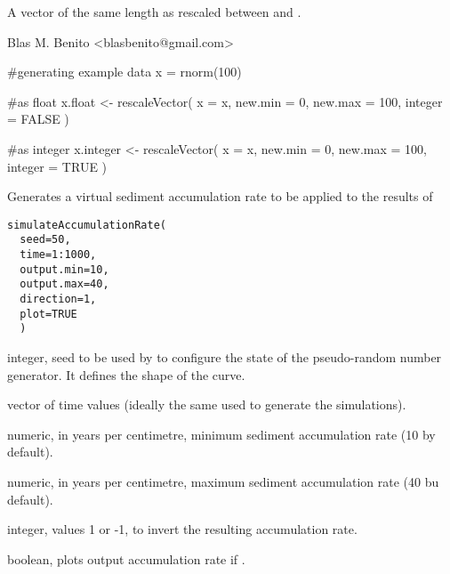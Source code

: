 \documentclass[letterpaper]{book}
\begin{document}
%
\begin{Value}
A vector of the same length as  rescaled between  and .
\end{Value}
%
\begin{Author}\relax
Blas M. Benito  <blasbenito@gmail.com>
\end{Author}
%
\begin{Examples}
\begin{ExampleCode}
#generating example data
x = rnorm(100)

#as float
x.float <- rescaleVector(
  x = x,
  new.min = 0,
  new.max = 100,
  integer = FALSE
  )

#as integer
x.integer <- rescaleVector(
  x = x,
  new.min = 0,
  new.max = 100,
  integer = TRUE
  )

\end{ExampleCode}
\end{Examples}
%
\begin{Description}\relax
Generates a virtual sediment accumulation rate to be applied to the results of 
\end{Description}
%
\begin{Usage}
\begin{verbatim}
simulateAccumulationRate(
  seed=50,
  time=1:1000,
  output.min=10,
  output.max=40,
  direction=1,
  plot=TRUE
  )
\end{verbatim}
\end{Usage}
%
\begin{Arguments}
\begin{ldescription}
\item[\code{seed}] integer, seed to be used by  to configure the state of the pseudo-random number generator. It defines the shape of the curve.

\item[\code{time}] vector of time values (ideally the same used to generate the simulations).

\item[\code{output.min}] numeric, in years per centimetre, minimum sediment accumulation rate (10 by default).

\item[\code{output.max}] numeric, in years per centimetre, maximum sediment accumulation rate (40 bu default).

\item[\code{direction}] integer, values 1 or -1, to invert the resulting accumulation rate.

\item[\code{plot}] boolean, plots output accumulation rate if .
\end{ldescription}
\end{Arguments}
\end{document}

